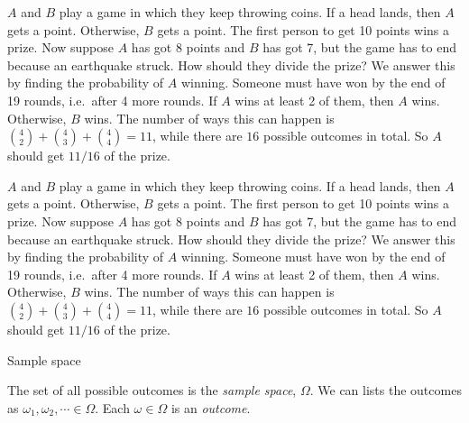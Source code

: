 \begin{note}
  \begin{field}
    \begin{eg}
      $A$ and $B$ play a game in which they keep throwing coins. If a head lands, then $A$ gets a point. Otherwise, $B$ gets a point. The first person to get 10 points wins a prize.
      Now suppose $A$ has got 8 points and $B$ has got 7, but the game has to end because an earthquake struck. How should they divide the prize? We answer this by finding the probability of $A$ winning. Someone must have won by the end of 19 rounds, i.e.\ after 4 more rounds. If $A$ wins at least 2 of them, then $A$ wins. Otherwise, $B$ wins.
      The number of ways this can happen is $\binom{4}{2} + \binom{4}{3} + \binom{4}{4} = 11$, while there are $16$ possible outcomes in total. So $A$ should get $11/16$ of the prize.
    \end{eg}
  \end{field}
  \begin{field}
    \begin{eg}
      $A$ and $B$ play a game in which they keep throwing coins. If a head lands, then $A$ gets a point. Otherwise, $B$ gets a point. The first person to get 10 points wins a prize.
      Now suppose $A$ has got 8 points and $B$ has got 7, but the game has to end because an earthquake struck. How should they divide the prize? We answer this by finding the probability of $A$ winning. Someone must have won by the end of 19 rounds, i.e.\ after 4 more rounds. If $A$ wins at least 2 of them, then $A$ wins. Otherwise, $B$ wins.
      The number of ways this can happen is $\binom{4}{2} + \binom{4}{3} + \binom{4}{4} = 11$, while there are $16$ possible outcomes in total. So $A$ should get $11/16$ of the prize.
    \end{eg}
  \end{field}
  \xplain{}%
\end{note}

%
\begin{note}
  \begin{field}
    Sample space
  \end{field}
  \begin{field}
    \begin{defi}
      The set of all possible outcomes is the \emph{sample space}, $\Omega$. We can lists the outcomes as $\omega_1, \omega_2, \cdots \in \Omega$. Each $\omega \in \Omega$ is an \emph{outcome}.
    \end{defi}
  \end{field}
  \xplain{}%
\end{note}

